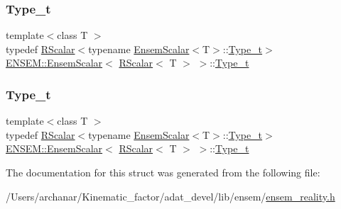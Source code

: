 \subsubsection{\texorpdfstring{Type\_t}{Type\_t}\hspace{0.1cm}{\footnotesize\ttfamily [1/2]}}
{\footnotesize\ttfamily template$<$class T $>$ \\
typedef \mbox{\hyperlink{classENSEM_1_1RScalar}{R\+Scalar}}$<$typename \mbox{\hyperlink{structENSEM_1_1EnsemScalar}{Ensem\+Scalar}}$<$T$>$\+::\mbox{\hyperlink{structENSEM_1_1EnsemScalar_3_01RScalar_3_01T_01_4_01_4_a153cd6d2b242e40d3614a2801d091aad}{Type\+\_\+t}}$>$ \mbox{\hyperlink{structENSEM_1_1EnsemScalar}{E\+N\+S\+E\+M\+::\+Ensem\+Scalar}}$<$ \mbox{\hyperlink{classENSEM_1_1RScalar}{R\+Scalar}}$<$ T $>$ $>$\+::\mbox{\hyperlink{structENSEM_1_1EnsemScalar_3_01RScalar_3_01T_01_4_01_4_a153cd6d2b242e40d3614a2801d091aad}{Type\+\_\+t}}}

\mbox{\label{structENSEM_1_1EnsemScalar_3_01RScalar_3_01T_01_4_01_4_a153cd6d2b242e40d3614a2801d091aad}} 
\subsubsection{\texorpdfstring{Type\_t}{Type\_t}\hspace{0.1cm}{\footnotesize\ttfamily [2/2]}}
{\footnotesize\ttfamily template$<$class T $>$ \\
typedef \mbox{\hyperlink{classENSEM_1_1RScalar}{R\+Scalar}}$<$typename \mbox{\hyperlink{structENSEM_1_1EnsemScalar}{Ensem\+Scalar}}$<$T$>$\+::\mbox{\hyperlink{structENSEM_1_1EnsemScalar_3_01RScalar_3_01T_01_4_01_4_a153cd6d2b242e40d3614a2801d091aad}{Type\+\_\+t}}$>$ \mbox{\hyperlink{structENSEM_1_1EnsemScalar}{E\+N\+S\+E\+M\+::\+Ensem\+Scalar}}$<$ \mbox{\hyperlink{classENSEM_1_1RScalar}{R\+Scalar}}$<$ T $>$ $>$\+::\mbox{\hyperlink{structENSEM_1_1EnsemScalar_3_01RScalar_3_01T_01_4_01_4_a153cd6d2b242e40d3614a2801d091aad}{Type\+\_\+t}}}



The documentation for this struct was generated from the following file\+:\begin{DoxyCompactItemize}
\item 
/\+Users/archanar/\+Kinematic\+\_\+factor/adat\+\_\+devel/lib/ensem/\mbox{\hyperlink{lib_2ensem_2ensem__reality_8h}{ensem\+\_\+reality.\+h}}\end{DoxyCompactItemize}
